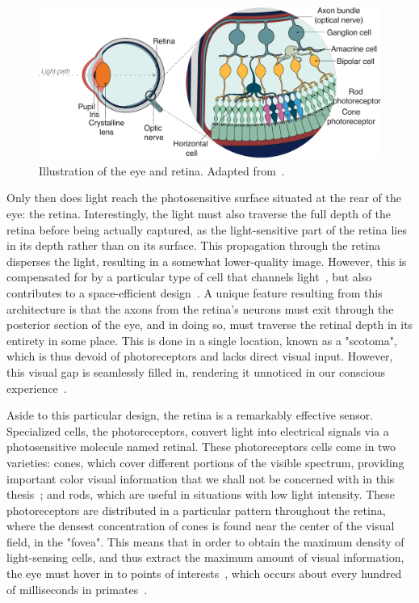 \begin{figure}[h!tbp]
\vspace{0.5cm}
\centering
\includegraphics[width=.9\textwidth]{fig/chap2_fig_retina.pdf}
\caption[Illustration of the eye and retina.]{Illustration of the eye and retina. Adapted from~\cite{holmes2018reconstructing}.}
\label{fig_chap2_vision_eye_retina}
\end{figure}
Only then does light reach the photosensitive surface situated at the rear of the eye: the retina. Interestingly, the light must also traverse the full depth of the retina before being actually captured, as the light-sensitive part of the retina lies in its depth rather than on its surface. This propagation through the retina disperses the light, resulting in a somewhat lower-quality image. However, this is compensated for by a particular type of cell that channels light~\cite{newman1996muller}, but also contributes to a space-efficient design~\cite{kroger2009space}. 
A unique feature resulting from this architecture is that the axons from the retina's neurons must exit through the posterior section of the eye, and in doing so, must traverse the retinal depth in its entirety in some place. This is done in a single location, known as a "scotoma", which is thus devoid of photoreceptors and lacks direct visual input. However, this visual gap is seamlessly filled in, rendering it unnoticed in our conscious experience~\cite{rohrschneider2004determination}.

Aside to this particular design, the retina is a remarkably effective sensor. Specialized cells, the photoreceptors, convert light into electrical signals via a photosensitive molecule named retinal. These photoreceptors cells come in two varieties: cones, which cover different portions of the visible spectrum, providing important color visual information that we shall not be concerned with in this thesis~\cite{gegenfurtner2003color}; and rods, which are useful in situations with low light intensity. These photoreceptors are distributed in a particular pattern throughout the retina, where the densest concentration of cones is found near the center of the visual field, in the "fovea". This means that in order to obtain the maximum density of light-sensing cells, and thus extract the maximum amount of visual information, the eye must hover in to points of interests~\cite{friston2012perceptions}, which occurs about every hundred of milliseconds in primates~\cite{ibbotson2011visual}. 

